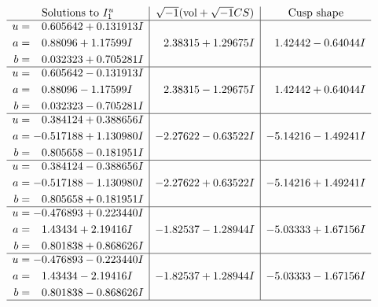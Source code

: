 \documentclass[1p]{elsarticle_modified}
\theoremstyle{definition}
\newcommand{\I}{\sqrt{-1}}
\begin{document}
$$\begin{array}{c|c|c}
\text{Solutions to }I^u_{1}& \I (\text{vol} + \sqrt{-1}CS) & \text{Cusp shape}\\
 \hline 
\begin{aligned}
u &= \phantom{-}0.605642 + 0.131913 I \\
a &= \phantom{-}0.88096 + 1.17599 I \\
b &= \phantom{-}0.032323 + 0.705281 I\end{aligned}
 & \phantom{-}2.38315 + 1.29675 I & \phantom{-}1.42442 - 0.64044 I \\ \hline\begin{aligned}
u &= \phantom{-}0.605642 - 0.131913 I \\
a &= \phantom{-}0.88096 - 1.17599 I \\
b &= \phantom{-}0.032323 - 0.705281 I\end{aligned}
 & \phantom{-}2.38315 - 1.29675 I & \phantom{-}1.42442 + 0.64044 I \\ \hline\begin{aligned}
u &= \phantom{-}0.384124 + 0.388656 I \\
a &= -0.517188 + 1.130980 I \\
b &= \phantom{-}0.805658 - 0.181951 I\end{aligned}
 & -2.27622 - 0.63522 I & -5.14216 - 1.49241 I \\ \hline\begin{aligned}
u &= \phantom{-}0.384124 - 0.388656 I \\
a &= -0.517188 - 1.130980 I \\
b &= \phantom{-}0.805658 + 0.181951 I\end{aligned}
 & -2.27622 + 0.63522 I & -5.14216 + 1.49241 I \\ \hline\begin{aligned}
u &= -0.476893 + 0.223440 I \\
a &= \phantom{-}1.43434 + 2.19416 I \\
b &= \phantom{-}0.801838 + 0.868626 I\end{aligned}
 & -1.82537 - 1.28944 I & -5.03333 + 1.67156 I \\ \hline\begin{aligned}
u &= -0.476893 - 0.223440 I \\
a &= \phantom{-}1.43434 - 2.19416 I \\
b &= \phantom{-}0.801838 - 0.868626 I\end{aligned}
 & -1.82537 + 1.28944 I & -5.03333 - 1.67156 I\\
 \hline 
 \end{array}$$\newpage\newpage\renewcommand{\arraystretch}{1}
\end{document}
